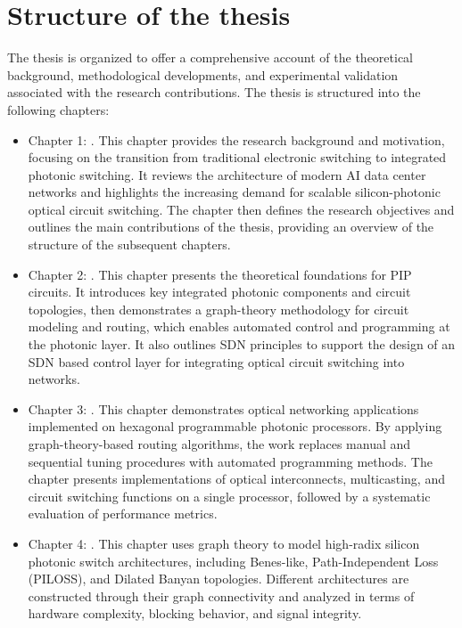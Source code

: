 \section{Structure of the thesis} \label{sec:structure}
The thesis is organized to offer a comprehensive account of the theoretical background, methodological developments, and experimental validation associated with the research contributions.
The thesis is structured into the following chapters:

\begin{itemize}
    \item Chapter 1: . This chapter provides the research background and motivation, focusing on the transition from traditional electronic switching to integrated photonic switching.
          It reviews the architecture of modern AI data center networks and highlights the increasing demand for scalable silicon-photonic optical circuit switching.
          The chapter then defines the research objectives and outlines the main contributions of the thesis, providing an overview of the structure of the subsequent chapters.
    \item Chapter 2: . This chapter presents the theoretical foundations for PIP circuits.
          It introduces key integrated photonic components and circuit topologies, then demonstrates a graph-theory methodology for circuit modeling and routing, which enables automated control and programming at the photonic layer.
          It also outlines SDN principles to support the design of an SDN based control layer for integrating optical circuit switching into networks.
    \item Chapter 3: . This chapter demonstrates optical networking applications implemented on hexagonal programmable photonic processors.
          By applying graph-theory-based routing algorithms, the work replaces manual and sequential tuning procedures with automated programming methods.
          The chapter presents implementations of optical interconnects, multicasting, and circuit switching functions on a single processor, followed by a systematic evaluation of performance metrics.
    \item Chapter 4: . This chapter uses graph theory to model high-radix silicon photonic switch architectures, including Benes-like, Path-Independent Loss (PILOSS), and Dilated Banyan topologies.
          Different architectures are constructed through their graph connectivity and analyzed in terms of hardware complexity, blocking behavior, and signal integrity.

\end{itemize}
